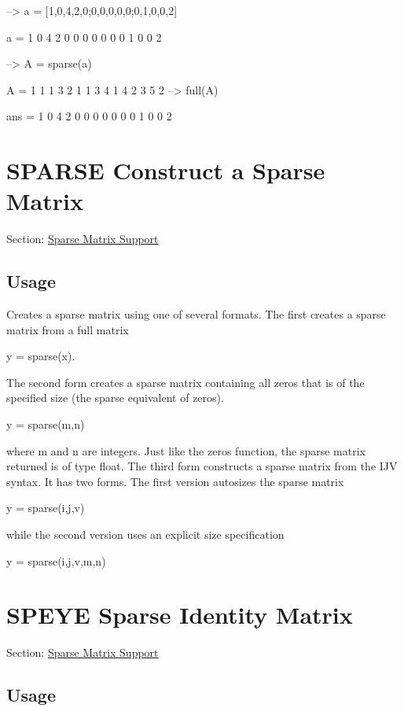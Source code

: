 \begin{DoxyVerbInclude}
--> a = [1,0,4,2,0;0,0,0,0,0;0,1,0,0,2]

a = 
 1 0 4 2 0 
 0 0 0 0 0 
 0 1 0 0 2 

--> A = sparse(a)

A = 
 1 1 1
 3 2 1
 1 3 4
 1 4 2
 3 5 2
--> full(A)

ans = 
 1 0 4 2 0 
 0 0 0 0 0 
 0 1 0 0 2 
\end{DoxyVerbInclude}
 \hypertarget{sparse_sparse}{}\section{S\-P\-A\-R\-S\-E Construct a Sparse Matrix}\label{sparse_sparse}
Section\-: \hyperlink{sec_sparse}{Sparse Matrix Support} \hypertarget{vtkwidgets_vtkxyplotwidget_Usage}{}\subsection{Usage}\label{vtkwidgets_vtkxyplotwidget_Usage}
Creates a sparse matrix using one of several formats. The first creates a sparse matrix from a full matrix \begin{DoxyVerb}   y = sparse(x).
\end{DoxyVerb}
 The second form creates a sparse matrix containing all zeros that is of the specified size (the sparse equivalent of {\ttfamily zeros}). \begin{DoxyVerb}   y = sparse(m,n)
\end{DoxyVerb}
 where {\ttfamily m} and {\ttfamily n} are integers. Just like the {\ttfamily zeros} function, the sparse matrix returned is of type {\ttfamily float}. The third form constructs a sparse matrix from the I\-J\-V syntax. It has two forms. The first version autosizes the sparse matrix \begin{DoxyVerb}   y = sparse(i,j,v)
\end{DoxyVerb}
 while the second version uses an explicit size specification \begin{DoxyVerb}   y = sparse(i,j,v,m,n)
\end{DoxyVerb}
 \hypertarget{sparse_speye}{}\section{S\-P\-E\-Y\-E Sparse Identity Matrix}\label{sparse_speye}
Section\-: \hyperlink{sec_sparse}{Sparse Matrix Support} \hypertarget{vtkwidgets_vtkxyplotwidget_Usage}{}\subsection{Usage}\label{vtkwidgets_vtkxyplotwidget_Usage}
